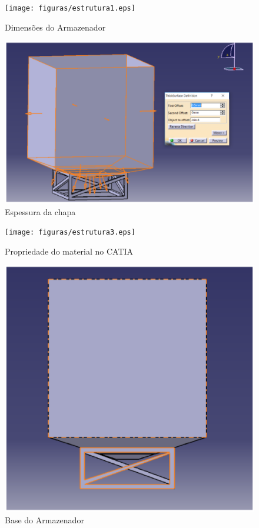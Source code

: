 \begin{figure}[H]
 \centering
   \texttt{[image: figuras/estrutura1.eps]}
 \caption{Dimensões do Armazenador}
 \label{estrutura1}
\end{figure}
\begin{figure}[H]
 \centering
   \includegraphics[keepaspectratio=true,scale=0.8]{figuras/estrutura2.eps}
 \caption{Espessura da chapa}
 \label{estrutura2}
\end{figure}
\begin{figure}[H]
 \centering
   \texttt{[image: figuras/estrutura3.eps]}
 \caption{Propriedade do material no CATIA}
 \label{estrutura3}
\end{figure}
\begin{figure}[H]
 \centering
   \includegraphics[keepaspectratio=true,scale=0.8]{figuras/estrutura4.eps}
 \caption{Base do Armazenador}
 \label{estrutura4}
\end{figure}

